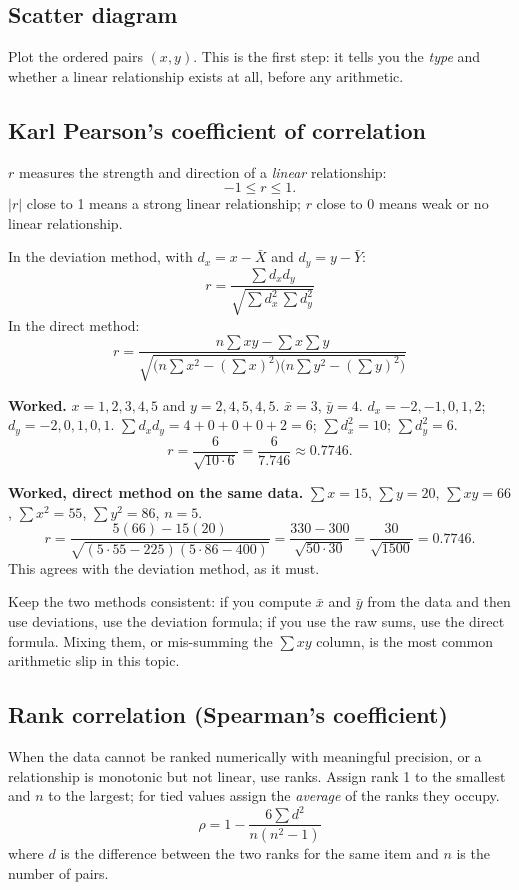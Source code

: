 \documentclass[11pt,a4paper]{article}
\begin{document}
\subsection{Scatter diagram}
Plot the ordered pairs $(x,y)$. This is the first step: it tells you the \emph{type} and whether a linear relationship exists at all, before any arithmetic.

\subsection{Karl Pearson's coefficient of correlation}
$r$ measures the strength and direction of a \emph{linear} relationship:
\[
-1\le r\le 1.
\]
$|r|$ close to 1 means a strong linear relationship; $r$ close to 0 means weak or no linear relationship.

In the deviation method, with $d_x=x-\bar X$ and $d_y=y-\bar Y$:
\[
\boxed{r=\frac{\sum d_xd_y}{\sqrt{\sum d_x^2\,\sum d_y^2}}}
\]
In the direct method:
\[
\boxed{r=\frac{n\sum xy-\sum x\sum y}{\sqrt{\bigl(n\sum x^2-(\sum x)^2\bigr)\bigl(n\sum y^2-(\sum y)^2\bigr)}}}
\]

\begin{exambox}
\textbf{Worked.} $x=1,2,3,4,5$ and $y=2,4,5,4,5$. $\bar x=3$, $\bar y=4$.
$d_x=-2,-1,0,1,2$; $d_y=-2,0,1,0,1$.
$\sum d_xd_y=4+0+0+0+2=6$; $\sum d_x^2=10$; $\sum d_y^2=6$.
\[
r=\frac{6}{\sqrt{10\cdot 6}}=\frac6{7.746}\approx\boxed{0.7746}.
\]
\end{exambox}

\begin{exambox}
\textbf{Worked, direct method on the same data.} $\sum x=15$, $\sum y=20$, $\sum xy=66$, $\sum x^2=55$, $\sum y^2=86$, $n=5$.
\[
r=\frac{5(66)-15(20)}{\sqrt{(5\cdot55-225)(5\cdot86-400)}}=\frac{330-300}{\sqrt{50\cdot30}}=\frac{30}{\sqrt{1500}}=\boxed{0.7746}.
\]
This agrees with the deviation method, as it must.
\end{exambox}

\begin{dangerbox}
Keep the two methods consistent: if you compute $\bar x$ and $\bar y$ from the data and then use deviations, use the deviation formula; if you use the raw sums, use the direct formula. Mixing them, or mis-summing the $\sum xy$ column, is the most common arithmetic slip in this topic.
\end{dangerbox}

\subsection{Rank correlation (Spearman's coefficient)}
When the data cannot be ranked numerically with meaningful precision, or a relationship is monotonic but not linear, use ranks. Assign rank 1 to the smallest and $n$ to the largest; for tied values assign the \emph{average} of the ranks they occupy.
\[
\boxed{\rho=1-\frac{6\sum d^2}{n(n^2-1)}}
\]
where $d$ is the difference between the two ranks for the same item and $n$ is the number of pairs.
\end{document}
